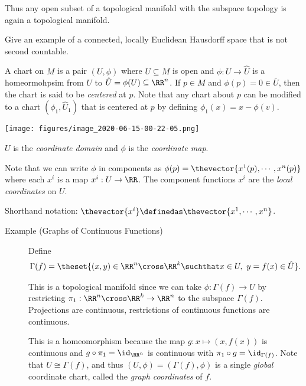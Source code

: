 Thus any open subset of a topological manifold with the subspace
topology is again a topological manifold.

\begin{description}
\tightlist
\item[Exercise]
Give an example of a connected, locally Euclidean Hausdorff space that
is not second countable.
\item[Definition (Charts)]
A chart on \(M\) is a pair \((U, \phi)\) where \(U\subseteq M\) is open
and \(\phi: U \to \hat U\) is a homeormohpsim from \(U\) to
\(\hat U = \phi(U) \subseteq \RR^n\). If \(p\in M\) and
\(\phi(p) = 0 \in \bar U\), then the chart is said to be \emph{centered}
at \(p\). Note that any chart about \(p\) can be modified to a chart
\((\phi_1, \hat U_1)\) that is centered at \(p\) by defining
\(\phi_1(x) = x - \phi(v)\).
\end{description}

\texttt{[image: figures/image\_2020-06-15-00-22-05.png]}

\(U\) is the \emph{coordinate domain} and \(\phi\) is the
\emph{coordinate map}.

Note that we can write \(\phi\) in components as
\(\phi(p) = \thevector{x^1(p), \cdots, x^n(p)}\) where each \(x^i\) is a
map \(x^i: U \to \RR\). The component functions \(x^i\) are the
\emph{local coordinates} on \(U\).

Shorthand notation:
\(\thevector{x^i} \definedas \thevector{x^1, \cdots, x^n}\).

\begin{description}
\item[Example (Graphs of Continuous Functions)]
Define \begin{align*}
\Gamma(f) = \theset{(x, y) \in \RR^{n} \cross \RR^{k} \suchthat x\in U,~ y = f(x) \in \hat U }
.\end{align*}

This is a topological manifold since we can take
\(\phi: \Gamma(f) \to U\) by restricting
\(\pi_1: \RR^{n}\cross \RR^k \to \RR^n\) to the subspace \(\Gamma(f)\).
Projections are continuous, restrictions of continuous functions are
continuous.

This is a homeomorphism because the map \(g: x \mapsto (x, f(x))\) is
continuous and \(g\circ \pi_1 = \id_{\RR^n}\) is continuous with
\(\pi_1 \circ g = \id_{\Gamma(f)}\). Note that \(U \cong \Gamma(f)\),
and thus \((U, \phi) = (\Gamma(f), \phi)\) is a single \emph{global}
coordinate chart, called the \emph{graph coordinates} of \(f\).
\end{description}


